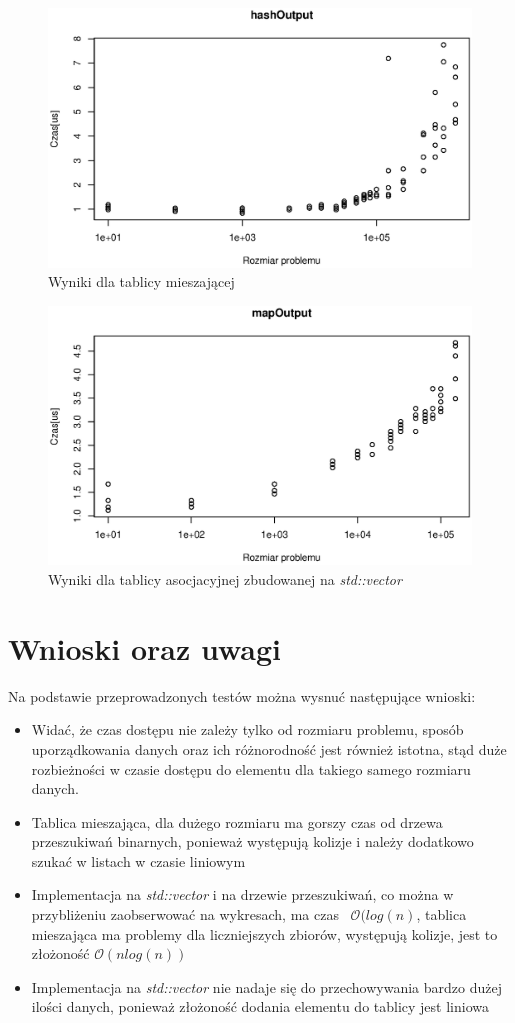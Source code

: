 \documentclass[10pt,a4paper]{article}
\begin{document}
\begin{figure}[H]
\centering
\includegraphics[width=0.7\linewidth]{./Wykresy/hashOutput}
\caption{Wyniki dla tablicy mieszającej}
\label{fig:hashOutput}
\end{figure}

\begin{figure}[H]
\centering
\includegraphics[width=0.7\linewidth]{./Wykresy/mapOutput}
\caption{Wyniki dla tablicy asocjacyjnej zbudowanej na \textit{std::vector}}
\label{fig:mapOutput}
\end{figure}



\section{Wnioski oraz uwagi}

Na podstawie przeprowadzonych testów można wysnuć następujące wnioski:
\begin{itemize}
\item Widać, że czas dostępu nie zależy tylko od rozmiaru problemu, sposób uporządkowania
danych oraz ich różnorodność jest również istotna, stąd duże rozbieżności w czasie dostępu 
do elementu dla takiego samego rozmiaru danych.
\item Tablica mieszająca, dla dużego rozmiaru ma gorszy czas od drzewa przeszukiwań binarnych,
ponieważ występują kolizje i należy dodatkowo szukać w listach w czasie liniowym
\item Implementacja na \textit{std::vector} i na drzewie przeszukiwań, co można 
w przybliżeniu zaobserwować na wykresach, ma czas ~$\mathcal{O}(log(n)$, 
tablica mieszająca ma problemy dla liczniejszych zbiorów, występują kolizje, jest to złożoność
$\mathcal{O}(nlog(n))$
\item Implementacja na \textit{std::vector} nie nadaje się do przechowywania bardzo dużej ilości
danych, ponieważ złożoność dodania elementu do tablicy jest liniowa
\end{itemize}
\end{document}
